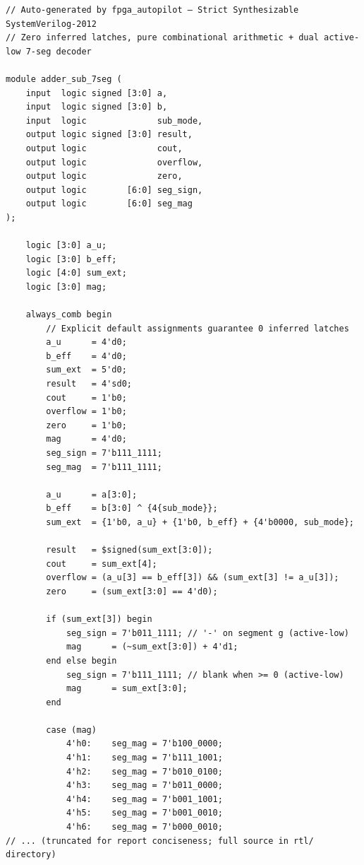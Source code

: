 \documentclass[11pt,a4paper]{article}
\begin{document}
\begin{lstlisting}
// Auto-generated by fpga_autopilot — Strict Synthesizable SystemVerilog-2012
// Zero inferred latches, pure combinational arithmetic + dual active-low 7-seg decoder

module adder_sub_7seg (
    input  logic signed [3:0] a,
    input  logic signed [3:0] b,
    input  logic              sub_mode,
    output logic signed [3:0] result,
    output logic              cout,
    output logic              overflow,
    output logic              zero,
    output logic        [6:0] seg_sign,
    output logic        [6:0] seg_mag
);

    logic [3:0] a_u;
    logic [3:0] b_eff;
    logic [4:0] sum_ext;
    logic [3:0] mag;

    always_comb begin
        // Explicit default assignments guarantee 0 inferred latches
        a_u      = 4'd0;
        b_eff    = 4'd0;
        sum_ext  = 5'd0;
        result   = 4'sd0;
        cout     = 1'b0;
        overflow = 1'b0;
        zero     = 1'b0;
        mag      = 4'd0;
        seg_sign = 7'b111_1111;
        seg_mag  = 7'b111_1111;

        a_u      = a[3:0];
        b_eff    = b[3:0] ^ {4{sub_mode}};
        sum_ext  = {1'b0, a_u} + {1'b0, b_eff} + {4'b0000, sub_mode};

        result   = $signed(sum_ext[3:0]);
        cout     = sum_ext[4];
        overflow = (a_u[3] == b_eff[3]) && (sum_ext[3] != a_u[3]);
        zero     = (sum_ext[3:0] == 4'd0);

        if (sum_ext[3]) begin
            seg_sign = 7'b011_1111; // '-' on segment g (active-low)
            mag      = (~sum_ext[3:0]) + 4'd1;
        end else begin
            seg_sign = 7'b111_1111; // blank when >= 0 (active-low)
            mag      = sum_ext[3:0];
        end

        case (mag)
            4'h0:    seg_mag = 7'b100_0000;
            4'h1:    seg_mag = 7'b111_1001;
            4'h2:    seg_mag = 7'b010_0100;
            4'h3:    seg_mag = 7'b011_0000;
            4'h4:    seg_mag = 7'b001_1001;
            4'h5:    seg_mag = 7'b001_0010;
            4'h6:    seg_mag = 7'b000_0010;
// ... (truncated for report conciseness; full source in rtl/ directory)
\end{lstlisting}
\end{document}
